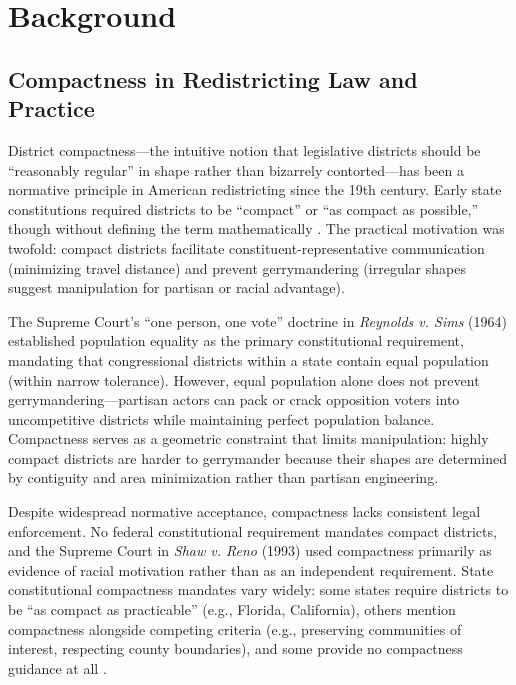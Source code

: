 
\section{Background}

\subsection{Compactness in Redistricting Law and Practice}

District compactness---the intuitive notion that legislative districts should be ``reasonably regular'' in shape rather than bizarrely contorted---has been a normative principle in American redistricting since the 19th century. Early state constitutions required districts to be ``compact'' or ``as compact as possible,'' though without defining the term mathematically \citep{young1988}. The practical motivation was twofold: compact districts facilitate constituent-representative communication (minimizing travel distance) and prevent gerrymandering (irregular shapes suggest manipulation for partisan or racial advantage).

The Supreme Court's ``one person, one vote'' doctrine in \emph{Reynolds v. Sims} (1964) established population equality as the primary constitutional requirement, mandating that congressional districts within a state contain equal population (within narrow tolerance). However, equal population alone does not prevent gerrymandering---partisan actors can pack or crack opposition voters into uncompetitive districts while maintaining perfect population balance. Compactness serves as a geometric constraint that limits manipulation: highly compact districts are harder to gerrymander because their shapes are determined by contiguity and area minimization rather than partisan engineering.

Despite widespread normative acceptance, compactness lacks consistent legal enforcement. No federal constitutional requirement mandates compact districts, and the Supreme Court in \emph{Shaw v. Reno} (1993) used compactness primarily as evidence of racial motivation rather than as an independent requirement. State constitutional compactness mandates vary widely: some states require districts to be ``as compact as practicable'' (e.g., Florida, California), others mention compactness alongside competing criteria (e.g., preserving communities of interest, respecting county boundaries), and some provide no compactness guidance at all \citep{levitt2018}.

